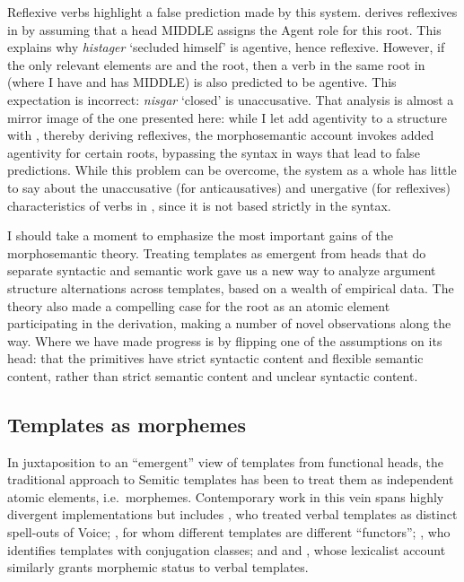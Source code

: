 Reflexive verbs highlight a false prediction made by this system. \citet[60]{doron03} derives reflexives in {\thit} by assuming that a head MIDDLE assigns the Agent role for this root. This explains why \emph{histager} `secluded himself' is agentive, hence reflexive. However, if the only relevant elements are {\vz} and the root, then a verb in the same root in {\tnif} (where I have {\vz} and \citealt{doron03} has MIDDLE) is also predicted to be agentive. This expectation is incorrect: \emph{nisgar} `closed' is unaccusative. That analysis is almost a mirror image of the one presented here: while I let {\va} add agentivity to a structure with \vz, thereby deriving reflexives, the morphosemantic account invokes added agentivity for certain roots, bypassing the syntax in ways that lead to false predictions. While this problem can be overcome, the system as a whole has little to say about the unaccusative (for anticausatives) and unergative (for reflexives) characteristics of verbs in {\thit}, since it is not based strictly in the syntax.

I should take a moment to emphasize the most important gains of the morphosemantic theory. Treating templates as emergent from heads that do separate syntactic and semantic work gave us a new way to analyze argument structure alternations across templates, based on a wealth of empirical data. The theory also made a compelling case for the root as an atomic element participating in the derivation, making a number of novel observations along the way. Where we have made progress is by flipping one of the assumptions on its head: that the primitives have strict syntactic content and flexible semantic content, rather than strict semantic content and unclear syntactic content.


	\subsection{Templates as morphemes} \label{sec:others-heb:morph}
In juxtaposition to an ``emergent'' view of templates from functional heads, the traditional approach to Semitic templates has been to treat them as independent atomic elements, i.e.~morphemes. Contemporary work in this vein spans highly divergent implementations but includes \cite{arad03,arad05}, who treated verbal templates as distinct spell-outs of Voice; \cite{borer13oup}, for whom different templates are different ``functors''; \cite{aronoff94,aronoff07}, who identifies templates with conjugation classes; and \cite{reinhartsiloni05} and \cite{laks11,laks14}, whose lexicalist account similarly grants morphemic status to verbal templates.

